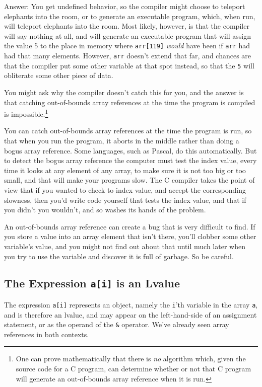 Answer: You get undefined behavior, so the compiler might choose to
teleport elephants into the room, or to generate an executable program,
which, when run, will teleport elephants into the room.  Most likely,
however, is that the compiler will say nothing at all, and will generate
an executable program that will assign the value 5 to the place in
memory where {\tt arr[119]} {\em would}\/ have been if {\tt arr} had had
that many elements.  However, {\tt arr} doesn't extend that far, and
chances are that the compiler put some other variable at that spot
instead, so that the {\tt 5} will obliterate some other piece of data.

You might ask why the compiler doesn't catch this for you, and the
answer is that catching out-of-bounds array references at the time the
program is compiled is impossible.\footnote{One can prove mathematically
that there is {\em no}\/ algorithm which, given the source code for a C
program, can determine whether or not that C program will generate an
out-of-bounds array reference when it is run.}

You can catch out-of-bounds array references at the time the program is
run, so that when you run the program, it aborts in the middle rather
than doing a bogus array reference.  Some languages, such as Pascal, do
this automatically.  But to detect the bogus array reference the
computer must test the index value, every time it looks at any element
of any array, to make sure it is not too big or too small, and that will
make your programs slow.  The C compiler takes the point of view that if
you wanted to check to index value, and accept the corresponding
slowness, then you'd write code yourself that tests the index value, and
that if you didn't you wouldn't, and so washes its hands of the problem.

An out-of-bounds array reference can create a bug that is very difficult
to find.  If you store a value into an array element that isn't there,
you'll clobber some other variable's value, and you might not find out
about that until much later when you try to use the variable and
discover it is full of garbage.  So be careful.

\subsection{The Expression {\tt a[i]} is an Lvalue}

The expression {\tt a[i]} represents an object, namely the {\tt i}'th
variable in the array {\tt a}, and is therefore an lvalue, and may
appear on the left-hand-side of an assignment statement, or as the
operand of the {\tt\&} operator.  We've already seen array references in
both contexts.

